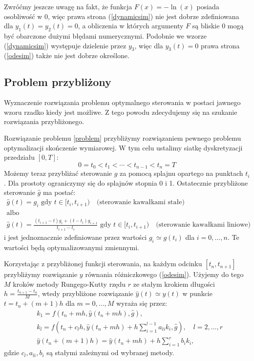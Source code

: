 \documentclass[11pt]{article}
\begin{document}
Zwróćmy jeszcze uwagę na fakt, że funkcja $F(x) = -\ln(x)$ posiada osobliwość w 0, więc prawa strona (\ref{dynamicsim}) nie jest dobrze zdefiniowana dla $y_1(t) = y_2(t) = 0$, a obliczenia w których argumenty $F$ są bliskie 0 mogą być obarczone dużymi błędami numerycznymi. Podobnie we wzorze (\ref{dynamicsim}) występuje dzielenie przez $y_3$, więc dla $y_3(t) = 0$ prawa strona (\ref{odesim}) także nie jest dobrze określone.

\subsection{Problem przybliżony}\label{simp_problem_subsec}
Wyznaczenie rozwiązania problemu optymalnego sterowania w postaci jawnego wzoru rzadko kiedy jest możliwe. Z tego powodu zdecydujemy się na szukanie rozwiązania przybliżonego.

Rozwiązanie problemu \ref{problem} przybliżymy rozwiązaniem pewnego problemu optymalizacji skończenie wymiarowej. W tym celu ustalimy siatkę dyskretyzacji przedziału $[0, T]$:
\begin{equation}
  0 = t_0 < t_1 < \cdots < t_{n-1} < t_n = T
\end{equation}
Możemy teraz przybliżać sterowanie $g$ za pomocą splajnu opartego na punktach $t_{i}$. Dla prostoty ograniczymy się do splajnów stopnia 0 i 1. Ostatecznie przybliżone sterowanie $\hat{g}$ ma postać:
\begin{gather}  
    \hat{g}(t) = g_i \text{ gdy } t \in [t_{i}, t_{i + 1}) \quad \text{(sterowanie kawałkami stałe)} \label{control_1}\\
    \nonumber \text{albo} \\
    \hat{g}(t) = \frac{(t_{i+1} - t)g_i + (t - t_i)g_{i+1}}{t_{i+1} - t_i} \text{ gdy } t \in [t_i, t_{i+1}) \quad \text{(sterowanie kawałkami liniowe)} \label{control_2}
\end{gather}
i jest jednoznacznie zdefiniowane przez wartości $g_i \simeq g(t_i)$ dla $i = 0,\ldots, n$. Te wartości będą optymalizowanymi zmiennymi.

Korzystając z przybliżonej funkcji sterowania, na każdym odcinku $[t_n, t_{n+1}]$ przybliżymy rozwiązanie $y$ równania różniczkowego (\ref{odesim}). Użyjemy do tego $M$ kroków metody Rungego-Kutty rzędu $r$ ze stałym krokiem długości $h = \frac{t_{n+1} - t_n}{M}$, wtedy przybliżone rozwiązanie $\hat{y}(t) \simeq y(t)$ w punkcie $t = t_n + (m + 1)h$ dla $m = 0,\ldots, M$  wyraża się przez:
\begin{equation} \label{rk}
  \begin{split}
    &k_1 = f(t_n + mh, \hat{y}(t_n + mh), \hat{g}), \\
    &k_l = f(t_n + c_l h, \hat{y}(t_n + mh) + h \sum_{i = 1}^{l-1} a_{li}k_i, \hat{g}),\quad l = 2,\ldots, r \\
    &\hat{y}(t_n + (m+1)h) = \hat{y}(t_n + mh) + h \sum_{i = 1}^r b_i k_i,
  \end{split}
\end{equation}
gdzie $c_l, a_{li}, b_i$ są stałymi zależnymi od wybranej metody.
\end{document}
